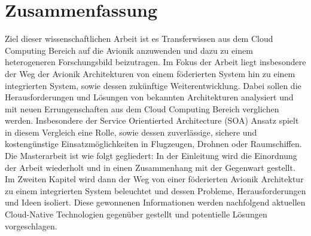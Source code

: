 \documentclass[titlepage]{report}
\begin{document}
\chapter*{Zusammenfassung}
Ziel dieser wissenschaftlichen Arbeit ist es Transferwissen aus dem Cloud Computing Bereich auf die Avionik
anzuwenden und dazu zu einem heterogeneren Forschungsbild beizutragen. Im Fokus der Arbeit liegt insbesondere
der Weg der Avionik Architekturen von einem föderierten System hin zu einem integrierten System, sowie dessen
zukünftige Weiterentwicklung. Dabei sollen die Herausforderungen und Lösungen von bekannten Architekturen
analysiert und mit neuen Errungenschaften aus dem Cloud Computing Bereich verglichen werden. Insbesondere
der Service Orientierted Architecture (SOA) Ansatz spielt in diesem Vergleich eine Rolle, sowie dessen
zuverlässige, sichere und kostengünstige Einsatzmöglichkeiten in Flugzeugen, Drohnen oder Raumschiffen.
Die Masterarbeit ist wie folgt gegliedert: In der Einleitung wird die Einordnung der Arbeit wiederholt
und in einen Zusammenhang mit der Gegenwart gestellt. Im Zweiten Kapitel wird dann der Weg von einer föderierten
Avionik Architektur zu einem integrierten System beleuchtet und dessen Probleme, Herausforderungen
und Ideen isoliert. Diese gewonnenen Informationen werden nachfolgend aktuellen Cloud-Native Technologien
gegenüber gestellt und potentielle Lösungen vorgeschlagen.

\tableofcontents
\end{document}
